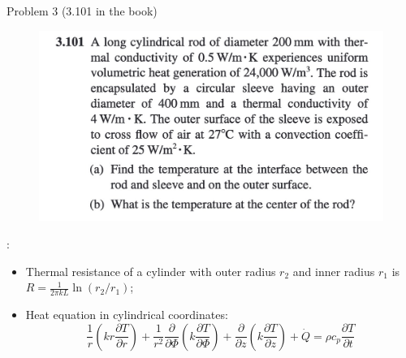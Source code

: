 \documentclass[9pt, aspectratio=169, handout]{beamer}
\begin{document}
\begin{frame}{Problem 3 (3.101 in the book)}
    \begin{figure}
        \centering
        \includegraphics[width=.5\textwidth]{Figures/fig1.3.jpg}
    \end{figure}
    :
    \begin{itemize}
        \item Thermal resistance of a cylinder with outer radius $r_2$ and inner radius $r_1$ is $R = \frac{1}{2\pi kL}\ln(r_2/r_1)$;
        \item Heat equation in cylindrical coordinates:
        \begin{equation}
            \frac{1}{r}\left(kr\frac{\partial T}{\partial r}\right) + \frac{1}{r^2} \frac{\partial }{\partial \Phi} \left(k\frac{\partial T}{\partial\Phi}\right) + \frac{\partial }{\partial z} \left(k\frac{\partial T}{\partial z}\right) + \dot{Q} = \rho c_p \frac{\partial T}{\partial t}
            \tag{2.26 in the book}
        \end{equation}
    \end{itemize}
\end{frame}
\end{document}
